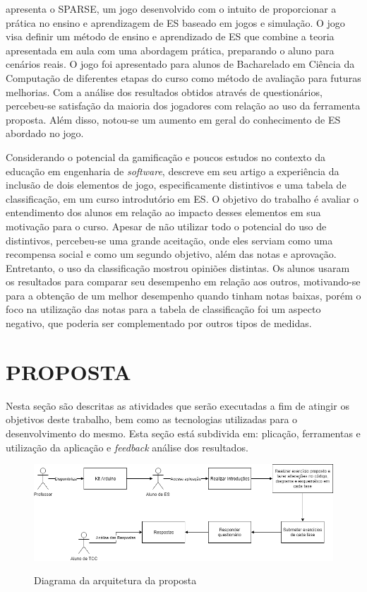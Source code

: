  apresenta o SPARSE, um jogo desenvolvido com o intuito de proporcionar a prática no ensino e aprendizagem de ES baseado em jogos e simulação. O jogo visa definir um método de ensino e aprendizado de ES que combine a teoria apresentada em aula com uma abordagem prática, preparando o aluno para cenários reais. O jogo foi apresentado para alunos de Bacharelado em Ciência da Computação de diferentes etapas do curso como método de avaliação para futuras melhorias. Com a análise dos resultados obtidos através de questionários, percebeu-se satisfação da maioria dos jogadores com relação ao uso da ferramenta proposta. Além disso, notou-se um aumento em geral do conhecimento de ES abordado no jogo.

Considerando o potencial da gamificação e poucos estudos no contexto da educação em engenharia de \textit{software},  descreve em seu artigo a experiência da inclusão de dois elementos de jogo, especificamente distintivos e uma tabela de classificação, em um curso introdutório em ES. O objetivo do trabalho é avaliar o entendimento dos alunos em relação ao impacto desses elementos em sua motivação para o curso. Apesar de não utilizar todo o potencial do uso de distintivos, percebeu-se uma grande aceitação, onde eles serviam como uma recompensa social e como um segundo objetivo, além das notas e aprovação. Entretanto, o uso da classificação mostrou opiniões distintas. Os alunos usaram os resultados para comparar seu desempenho em relação aos outros, motivando-se para a obtenção de um melhor desempenho quando tinham notas baixas, porém o foco na utilização das notas para a tabela de classificação foi um aspecto negativo, que poderia ser complementado por outros tipos de medidas.

\chapter{PROPOSTA}
\label{chap:proposta}

Nesta seção são descritas as atividades que serão executadas a fim de atingir os objetivos deste trabalho, bem como as tecnologias utilizadas para o desenvolvimento do mesmo. Esta seção está subdivida em: plicação, ferramentas e utilização da aplicação e \textit{feedback} análise dos resultados.  

\begin{figure}[!htb]
    \centering
    \caption{Diagrama da arquitetura da proposta}
    \includegraphics[width=1\textwidth]{./dados/figuras/diagramaProjeto}
    \label{fig:figura-diagramaApp}
\end{figure}

